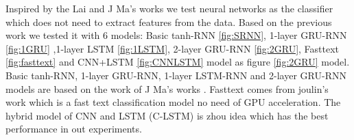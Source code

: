  Inspired by the Lai and J Ma's works \cite{lai2015recurrent} \cite{madetecting} we test neural networks as the classifier which does not need to extract features from the data.
Based on the previous work we tested it with 6 models: Basic tanh-RNN \ref{fig:SRNN}, 1-layer GRU-RNN \ref{fig:1GRU} ,1-layer LSTM \ref{fig:1LSTM}, 2-layer GRU-RNN \ref{fig:2GRU}, Fasttext \ref{fig:fasttext} and CNN+LSTM \ref{fig:CNNLSTM}  model  as figure \ref{fig:2GRU} model. Basic tanh-RNN, 1-layer GRU-RNN, 1-layer LSTM-RNN and 2-layer GRU-RNN models are based on the work of J Ma's works \cite{madetecting} . Fasttext comes from joulin's work  \cite{joulin2016bag} which is a fast text classification model no need of GPU acceleration. The hybrid model of CNN and LSTM (C-LSTM) is zhou idea \cite{zhou2015c} which has the best performance in out experiments. 

